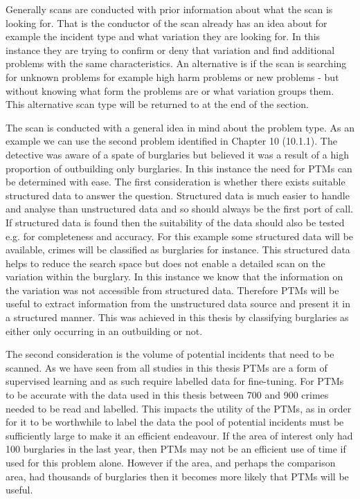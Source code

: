Generally scans are conducted with prior information about what the scan is looking for. That is the conductor of the scan already has an idea about for example the incident type and what variation they are looking for. In this instance they are trying to confirm or deny that variation and find additional problems with the same characteristics. An alternative is if the scan is searching for unknown problems for example high harm problems or new problems - but without knowing what form the problems are or what variation groups them. This alternative scan type will be returned to at the end of the section.

The scan is conducted with a general idea in mind about the problem type. As an example we can use the second problem identified in Chapter 10 (10.1.1). The detective was aware of a spate of burglaries but believed it was a result of a high proportion of outbuilding only burglaries.  In this instance the need for PTMs can be determined with ease. The first consideration is whether there exists suitable structured data to answer the question. Structured data is much easier to handle and analyse than unstructured data and so should always be the first port of call. If structured data is found then the suitability of the data should also be tested e.g. for completeness and accuracy.  For this example some structured data will be available, crimes will be classified as burglaries for instance. This structured data helps to reduce the search space but does not enable a detailed scan on the variation within the burglary. In this instance we know that the information on the variation was not accessible from structured data. Therefore PTMs will be useful to extract information from the unstructured data source and present it in a structured manner. This was achieved in this thesis by classifying burglaries as either only occurring in an outbuilding or not.  

The second consideration is the volume of potential incidents that need to be scanned. As we have seen from all studies in this thesis PTMs are a form of supervised learning and as such require labelled data for fine-tuning. For PTMs to be accurate with the data used in this thesis between 700 and 900 crimes needed to be read and labelled. This impacts the utility of the PTMs, as in order for it to be worthwhile to label the data the pool of potential incidents must be sufficiently large to make it an efficient endeavour. If the area of interest only had 100 burglaries in the last year, then PTMs may not be an efficient use of time if used for this problem alone. However if the area, and perhaps the comparison area, had thousands of burglaries then it becomes more likely that PTMs will be useful.

